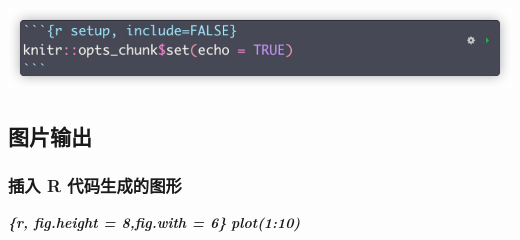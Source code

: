 \documentclass[
]{book}
\newenvironment{Shaded}{\begin{snugshade}}{\end{snugshade}}
\newcommand{\InformationTok}[1]{\textcolor[rgb]{0.56,0.35,0.01}{\textbf{\textit{#1}}}}
\begin{document}
\includegraphics{images/paste-7488C7A3.png}

\hypertarget{ux56feux7247ux8f93ux51fa}{%
\subsection{图片输出}\label{ux56feux7247ux8f93ux51fa}}

\hypertarget{ux63d2ux5165-r-ux4ee3ux7801ux751fux6210ux7684ux56feux5f62}{%
\subsubsection{插入 R 代码生成的图形}\label{ux63d2ux5165-r-ux4ee3ux7801ux751fux6210ux7684ux56feux5f62}}

\begin{Shaded}
\begin{Highlighting}[]
\InformationTok{\textasciigrave{}\textasciigrave{}\textasciigrave{}\{r, fig.height = 8,fig.with = 6\}}
\InformationTok{plot(1:10)}
\end{Highlighting}
\end{Shaded}
\end{document}
